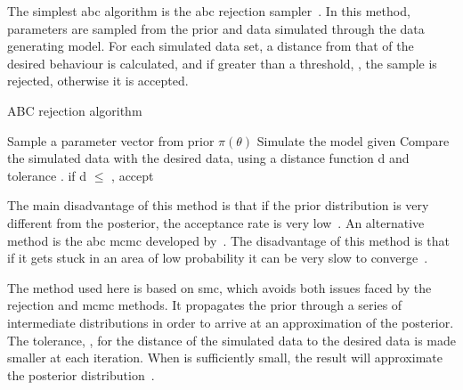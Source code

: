 The simplest \acrshort{abc} algorithm is the \acrshort{abc} rejection sampler~\autocite{Pritchard:1999td}. In this method, parameters are sampled from the prior and data simulated through the data generating model. For each simulated data set, a distance from that of the desired behaviour is calculated, and if greater than a threshold, \textepsilon{}, the sample is rejected, otherwise it is accepted. 
\begin{algorithm}[H]

  \caption{ABC rejection algorithm}
 	\label{alg:ABC}
 \begin{algorithmic}[1]
    \Statex
	\State Sample a parameter vector \texttheta{} from prior $\pi(\theta)$
	\State Simulate the model given \texttheta{}
    \State Compare the simulated data with the desired data, using a distance function d and tolerance \textepsilon{}. if d $\leq$ \textepsilon{}, accept \texttheta{} 
   
  \end{algorithmic}
\end{algorithm}


\noindent The main disadvantage of this method is that if the prior distribution is very different from the posterior, the acceptance rate is very low~\autocite{Toni:2009tr}. An alternative method is the \acrshort{abc} \acrfull{mcmc} developed by~\textcite{Marjoram:2003up}. The disadvantage of this method is that if it gets stuck in an area of low probability it can be very slow to converge~\autocite{Sisson:wf}. 

The method used here is based on \acrlong{smc}, which avoids both issues faced by the rejection and \acrshort{mcmc} methods. It propagates the prior through a series of intermediate distributions in order to arrive at an approximation of the posterior. The tolerance, \textepsilon{}, for the distance of the simulated data to the desired data is made smaller at each iteration. When \textepsilon{} is sufficiently small, the result will approximate the posterior distribution~\autocite{Toni:2009tr}.  


